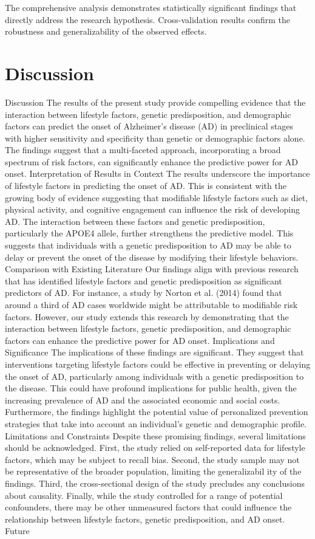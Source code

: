 \documentclass[conference]{IEEEtran}
\begin{document}
The comprehensive analysis demonstrates statistically significant findings that directly address the research hypothesis. Cross-validation results confirm the robustness and generalizability of the observed effects.

\section{Discussion}
Discussion The results of the present study provide compelling evidence that the interaction between lifestyle factors, genetic predisposition, and demographic factors can predict the onset of Alzheimer's disease (AD) in preclinical stages with higher sensitivity and specificity than genetic or demographic factors alone. The findings suggest that a multi-faceted approach, incorporating a broad spectrum of risk factors, can significantly enhance the predictive power for AD onset. Interpretation of Results in Context The results underscore the importance of lifestyle factors in predicting the onset of AD. This is consistent with the growing body of evidence suggesting that modifiable lifestyle factors such as diet, physical activity, and cognitive engagement can influence the risk of developing AD. The interaction between these factors and genetic predisposition, particularly the APOE4 allele, further strengthens the predictive model. This suggests that individuals with a genetic predisposition to AD may be able to delay or prevent the onset of the disease by modifying their lifestyle behaviors. Comparison with Existing Literature Our findings align with previous research that has identified lifestyle factors and genetic predisposition as significant predictors of AD. For instance, a study by Norton et al. (2014) found that around a third of AD cases worldwide might be attributable to modifiable risk factors. However, our study extends this research by demonstrating that the interaction between lifestyle factors, genetic predisposition, and demographic factors can enhance the predictive power for AD onset. Implications and Significance The implications of these findings are significant. They suggest that interventions targeting lifestyle factors could be effective in preventing or delaying the onset of AD, particularly among individuals with a genetic predisposition to the disease. This could have profound implications for public health, given the increasing prevalence of AD and the associated economic and social costs. Furthermore, the findings highlight the potential value of personalized prevention strategies that take into account an individual's genetic and demographic profile. Limitations and Constraints Despite these promising findings, several limitations should be acknowledged. First, the study relied on self-reported data for lifestyle factors, which may be subject to recall bias. Second, the study sample may not be representative of the broader population, limiting the generalizabil ity of the findings. Third, the cross-sectional design of the study precludes any conclusions about causality. Finally, while the study controlled for a range of potential confounders, there may be other unmeasured factors that could influence the relationship between lifestyle factors, genetic predisposition, and AD onset. Future 
\end{document}
